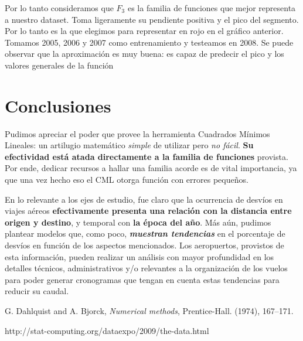 \documentclass{endm}
\begin{document}
Por lo tanto consideramos que $F_3$ es la familia de funciones que mejor representa a nuestro dataset. Toma ligeramente su pendiente positiva y el pico del segmento. Por lo tanto es la que elegimos para representar en rojo en el gr\'afico anterior. Tomamos 2005, 2006 y 2007 como entrenamiento y testeamos en 2008. Se puede observar que la aproximaci\'on es muy buena: es capaz de predecir el pico y los valores generales de la funci\'on

\section{Conclusiones}

Pudimos apreciar el poder que provee la herramienta Cuadrados M\'inimos Lineales: un artilugio matem\'atico \textit{simple} de utilizar pero \textit{no f\'acil}. \textbf{Su efectividad est\'a atada directamente a la familia de funciones} provista. Por ende, dedicar recursos a hallar una familia acorde es de vital importancia, ya que una vez hecho eso el CML otorga funci\'on con errores peque\~nos. 

En lo relevante a los ejes de estudio, fue claro que la ocurrencia de desv\'ios en viajes a\'ereos \textbf{efectivamente presenta una relaci\'on con la distancia entre origen y destino}, y temporal con \textbf{la \'epoca del a\~no}. M\'as a\'un, pudimos plantear modelos que, como poco, \textit{\textbf{muestran tendencias}} en el porcentaje de desv\'ios en funci\'on de los aspectos mencionados. Los aeropuertos, provistos de esta informaci\'on, pueden realizar un an\'alisis con mayor profundidad en los detalles t\'ecnicos, administrativos y/o relevantes a la organizaci\'on de los vuelos para poder generar cronogramas que tengan en cuenta estas tendencias para reducir su caudal.

\begin{thebibliography}{10}\label{bibliography}

 G. Dahlquist and A. Bjorck, \emph{Numerical methods}, Prentice-Hall. (1974), 167--171.

 http://stat-computing.org/dataexpo/2009/the-data.html
\end{thebibliography}
\end{document}
